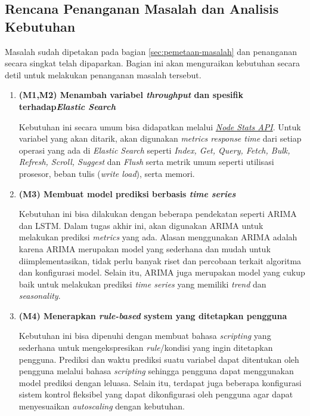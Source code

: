 \subsection{Rencana Penanganan Masalah dan Analisis Kebutuhan}

Masalah sudah dipetakan pada bagian \ref{sec:pemetaan-masalah} dan penanganan secara singkat telah dipaparkan. Bagian ini akan menguraikan kebutuhan secara detil untuk melakukan penanganan masalah tersebut.

\begin{enumerate}
    \item \textbf{(M1,M2) Menambah variabel \textit{throughput} dan spesifik terhadap\textit{Elastic Search}}
    
    Kebutuhan ini secara umum bisa didapatkan melalui \href{https://www.elastic.co/guide/en/elasticsearch/reference/current/cluster-nodes-stats.html}{\textit{Node Stats API}}. Untuk variabel yang akan ditarik, akan digunakan \textit{metrics response time} dari setiap operasi yang ada di \textit{Elastic Search} seperti \textit{Index, Get, Query, Fetch, Bulk, Refresh, Scroll, Suggest} dan \textit{Flush} serta metrik umum seperti utilisasi prosesor, beban tulis (\textit{write load}), serta memori.

    \item \textbf{(M3) Membuat model prediksi berbasis \textit{time series}}
    
    Kebutuhan ini bisa dilakukan dengan beberapa pendekatan seperti ARIMA dan LSTM. Dalam tugas akhir ini, akan digunakan ARIMA untuk melakukan prediksi \textit{metrics} yang ada. Alasan menggunakan ARIMA adalah karena ARIMA merupakan model yang sederhana dan mudah untuk diimplementasikan, tidak perlu banyak riset dan percobaan terkait algoritma dan konfigurasi model. Selain itu, ARIMA juga merupakan model yang cukup baik untuk melakukan prediksi \textit{time series} yang memiliki \textit{trend} dan \textit{seasonality}.

    \item \textbf{(M4) Menerapkan \textit{rule-based} system yang ditetapkan pengguna}
    
    Kebutuhan ini bisa dipenuhi dengan membuat bahasa \textit{scripting} yang sederhana untuk mengekspresikan \textit{rule}/kondisi yang ingin ditetapkan pengguna. Prediksi dan waktu prediksi suatu variabel dapat ditentukan oleh pengguna melalui bahasa \textit{scripting} sehingga pengguna dapat menggunakan model prediksi dengan leluasa. Selain itu, terdapat juga beberapa konfigurasi sistem kontrol fleksibel yang dapat dikonfigurasi oleh pengguna agar dapat menyesuaikan \textit{autoscaling} dengan kebutuhan.


\end{enumerate}
